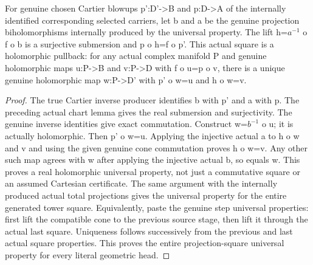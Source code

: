 \begin{lemma}
\label{hir:submersion-choice-actual-cartier-universal}
\leanok
For genuine chosen Cartier blowups p':D'->B and p:D->A of the internally
identified corresponding selected carriers, let b and a be the genuine
projection biholomorphisms internally produced by the universal property.
The lift h=$a^{-1}$ o f o b is a surjective submersion and p o h=f o p'.
This actual square is a holomorphic pullback: for any actual complex
manifold P and genuine holomorphic maps u:P->B and v:P->D with f o u=p o v,
there is a unique genuine holomorphic map w:P->D' with p' o w=u and h o w=v.
\end{lemma}
\begin{proof}
The true Cartier inverse producer identifies b with p' and a with p.
The preceding actual chart lemma gives the real submersion and surjectivity.
The genuine inverse identities give exact commutation. Construct w=$b^{-1}$
o u; it is actually holomorphic. Then p' o w=u. Applying the injective
actual a to h o w and v and using the given genuine cone commutation proves
h o w=v. Any other such map agrees with w after applying the injective
actual b, so equals w. This proves a real holomorphic universal property,
not just a commutative square or an assumed Cartesian certificate. The same
argument with the internally produced actual total projections gives the
universal property for the entire generated tower square. Equivalently,
paste the genuine step universal properties: first lift the compatible cone
to the previous source stage, then lift it through the actual last square.
Uniqueness follows successively from the previous and last actual square
properties. This proves the entire projection-square universal property
for every literal geometric head.
\end{proof}

